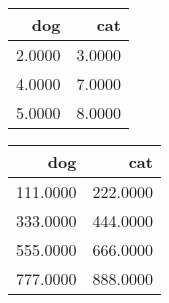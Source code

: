 \begin{tabular}{rr}
\hline
    dog &    cat \\
\hline
 2.0000 & 3.0000 \\
 4.0000 & 7.0000 \\
 5.0000 & 8.0000 \\
\hline
\end{tabular}\begin{tabular}{rr}
\hline
      dog &      cat \\
\hline
 111.0000 & 222.0000 \\
 333.0000 & 444.0000 \\
 555.0000 & 666.0000 \\
 777.0000 & 888.0000 \\
\hline
\end{tabular}